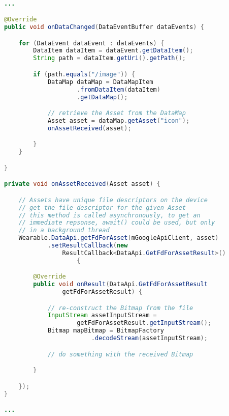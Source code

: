 \begin{lstlisting}[language=Java]

...

@Override
public void onDataChanged(DataEventBuffer dataEvents) {

    for (DataEvent dataEvent : dataEvents) {
        DataItem dataItem = dataEvent.getDataItem();
        String path = dataItem.getUri().getPath();

        if (path.equals("/image")) {
            DataMap dataMap = DataMapItem
                    .fromDataItem(dataItem)
                    .getDataMap();

            // retrieve the Asset from the DataMap
            Asset asset = dataMap.getAsset("icon");
            onAssetReceived(asset);

        }
    }

}

private void onAssetReceived(Asset asset) {

    // Assets have unique file descriptors on the device
    // get the file descriptor for the given Asset
    // this method is called asynchronously, to get an
    // immediate repsonse, await() could be used, but only
    // in a background thread
    Wearable.DataApi.getFdForAsset(mGoogleApiClient, asset)
            .setResultCallback(new
                ResultCallback<DataApi.GetFdForAssetResult>()
                    {

        @Override
        public void onResult(DataApi.GetFdForAssetResult
                getFdForAssetResult) {

            // re-construct the Bitmap from the file
            InputStream assetInputStream =
                    getFdForAssetResult.getInputStream();
            Bitmap mapBitmap = BitmapFactory
                        .decodeStream(assetInputStream);

            // do something with the received Bitmap

        }

    });
}

...

\end{lstlisting}
